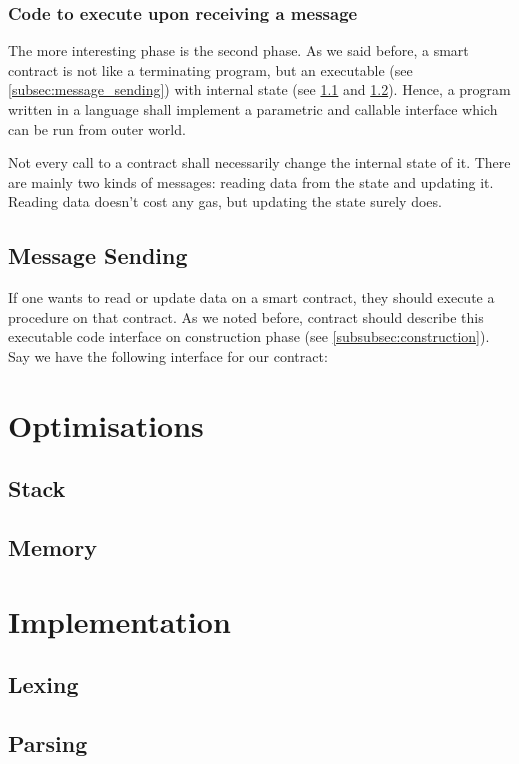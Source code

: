 \documentclass{article}
\begin{document}
\subsubsection{Code to execute upon receiving a message}
\par The more interesting phase is the second phase. As we said before, a smart contract is not like a terminating program, but an executable (see \ref{subsec:message_sending}) with internal state (see \ref{subsec:stack} and \ref{subsec:memory}). Hence, a program written in a language shall implement a parametric and callable interface which can be run from outer world.
\par Not every call to a contract shall necessarily change the internal state of it. There are mainly two kinds of messages: reading data from the state and updating it. Reading data doesn't cost any gas, but updating the state surely does.
\subsection{Message Sending}
If one wants to read or update data on a smart contract, they should execute a procedure on that contract. As we noted before, contract should describe this executable code interface on construction phase (see \ref{subsubsec:construction}). Say we have the following interface for our contract:
\newpage

\label{subsec:message_sending}
\section{Optimisations}
\subsection{Stack}
\label{subsec:stack}
\subsection{Memory}
\label{subsec:memory}
\section{Implementation}
\subsection{Lexing}
\label{subsec:lexing}
\subsection{Parsing}
\label{subsec:parsing}
\end{document}
